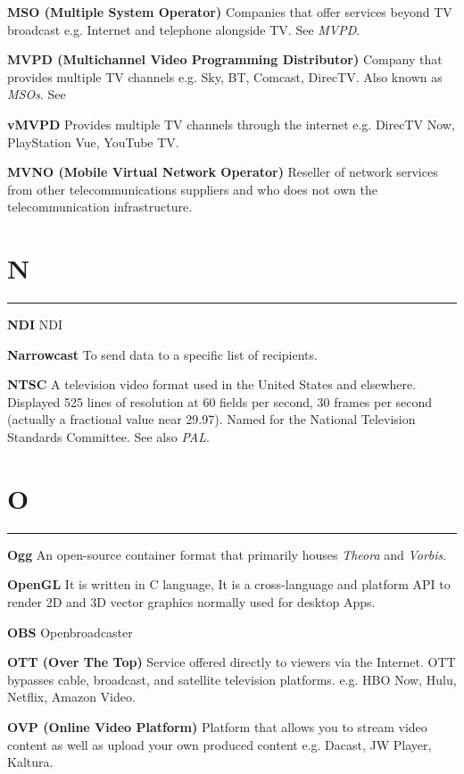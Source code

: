 \smallskip
\textbf{MSO (Multiple System Operator)}
Companies that offer services beyond TV broadcast e.g. Internet and telephone alongside TV.  See \textit{MVPD}.


\smallskip
\textbf{MVPD (Multichannel Video Programming Distributor)}
Company that provides multiple TV channels e.g. Sky, BT, Comcast, DirecTV. Also known as \textit{MSOs}. See

\smallskip
\textbf{vMVPD}
Provides multiple TV channels through the internet e.g. DirecTV Now, PlayStation Vue, YouTube TV.

\smallskip
\textbf{MVNO (Mobile Virtual Network Operator)}
Reseller of network services from other telecommunications suppliers and who does not own the telecommunication infrastructure.


\section{N}
\hrule

\medskip
\textbf{NDI}
NDI

\smallskip
\textbf{Narrowcast}
To send data to a specific list of recipients.

\smallskip
\textbf{NTSC}
A television video format used in the United States and elsewhere. Displayed 525 lines of resolution at 60 fields per second, 30 frames per second (actually a fractional value near 29.97). Named for the National Television Standards Committee. See also \textit{PAL}.


\section{O}
\hrule

\medskip
\textbf{Ogg}
An open-source container format that primarily houses \textit{Theora} and \textit{Vorbis}.

\smallskip
\textbf{OpenGL}
It is written in C language, It is a cross-language and platform API to render 2D and 3D vector graphics normally used for desktop Apps.

\smallskip
\textbf{OBS}
Openbroadcaster

\smallskip
\textbf{OTT (Over The Top)}
Service offered directly to viewers via the Internet. OTT bypasses cable, broadcast, and satellite television platforms. e.g. HBO Now, Hulu, Netflix, Amazon Video.

\smallskip
\textbf{OVP (Online Video Platform)}
Platform that allows you to stream video content as well as upload your own produced content e.g. Dacast, JW Player, Kaltura.


